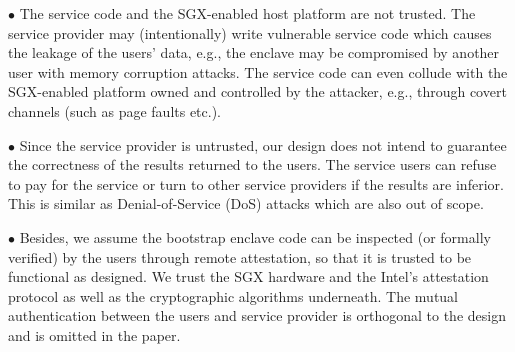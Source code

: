 {%

\vspace{2pt}\noindent$\bullet${ The service code and the SGX-enabled host platform are not trusted.} The service provider may (intentionally) write vulnerable service code which causes the leakage of the users' data, e.g., the enclave may be compromised by another user with memory corruption attacks. The service code can even collude with the SGX-enabled platform owned and controlled by the attacker, e.g., through covert channels (such as page faults etc.). 



\vspace{2pt}\noindent$\bullet$ Since the service provider is untrusted, our design does not intend to guarantee the correctness of the results returned to the users. The service users can refuse to pay for the service or turn to other service providers if the results are inferior. This is similar as Denial-of-Service (DoS) attacks which are also out of scope.

\vspace{2pt}\noindent$\bullet$ Besides, we assume the bootstrap enclave code can be inspected (or formally verified) by the users through remote attestation, so that it is trusted to be functional as designed. We trust the SGX hardware and the Intel's attestation protocol as well as the cryptographic algorithms underneath. The mutual authentication between the users and service provider is orthogonal to the design and is omitted in the paper.

}

    
    